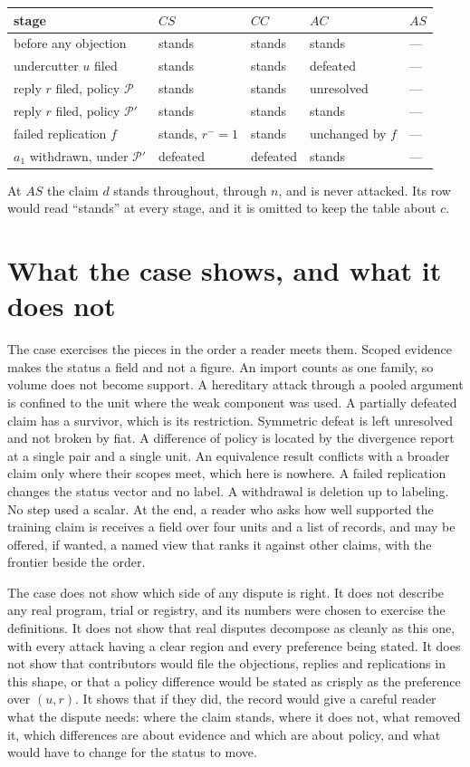 \documentclass[11pt]{article}
\begin{document}
\begin{center}
\small
\begin{tabularx}{\textwidth}{@{}X l l l l@{}}
\toprule
stage & $CS$ & $CC$ & $AC$ & $AS$\\
\midrule
before any objection & stands & stands & stands & ---\\
undercutter $u$ filed & stands & stands & defeated & ---\\
reply $r$ filed, policy $\mathcal P$ & stands & stands & unresolved & ---\\
reply $r$ filed, policy $\mathcal P'$ & stands & stands & stands & ---\\
failed replication $f$ & stands, $r^-{=}1$ & stands & unchanged by $f$ & ---\\
$a_1$ withdrawn, under $\mathcal P'$ & defeated & defeated & stands & ---\\
\bottomrule
\end{tabularx}
\end{center}

At $AS$ the claim $d$ stands throughout, through $n$, and is never attacked. Its row would read ``stands'' at every stage, and it is omitted to keep the table about $c$.

\section{What the case shows, and what it does not}\label{sec:shows}

The case exercises the pieces in the order a reader meets them. Scoped evidence makes the status a field and not a figure. An import counts as one family, so volume does not become support. A hereditary attack through a pooled argument is confined to the unit where the weak component was used. A partially defeated claim has a survivor, which is its restriction. Symmetric defeat is left unresolved and not broken by fiat. A difference of policy is located by the divergence report at a single pair and a single unit. An equivalence result conflicts with a broader claim only where their scopes meet, which here is nowhere. A failed replication changes the status vector and no label. A withdrawal is deletion up to labeling. No step used a scalar. At the end, a reader who asks how well supported the training claim is receives a field over four units and a list of records, and may be offered, if wanted, a named view that ranks it against other claims, with the frontier beside the order.

The case does not show which side of any dispute is right. It does not describe any real program, trial or registry, and its numbers were chosen to exercise the definitions. It does not show that real disputes decompose as cleanly as this one, with every attack having a clear region and every preference being stated. It does not show that contributors would file the objections, replies and replications in this shape, or that a policy difference would be stated as crisply as the preference over $(u,r)$. It shows that if they did, the record would give a careful reader what the dispute needs: where the claim stands, where it does not, what removed it, which differences are about evidence and which are about policy, and what would have to change for the status to move.
\end{document}
